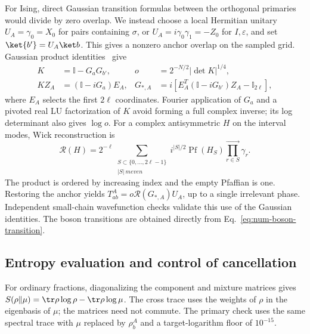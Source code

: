 For Ising, direct Gaussian transition formulas between the
orthogonal primaries would divide by zero overlap. We instead
choose a local Hermitian unitary $U_A=\gamma_0=X_0$ for pairs
containing $\sigma$, or $U_A=i\gamma_0\gamma_1=-Z_0$ for
$I,\varepsilon$, and set $\ket{b'}=U_A\ket b$.
This gives a nonzero anchor overlap on the sampled grid.
Gaussian product identities~\cite{numBravyi,numSurace} give
\begin{align}
 K&=\mathbb I-G_aG_{b'},&
 o&=2^{-N/2}|\det K|^{1/4},\nonumber\\
 KZ_A&=(\mathbb I-iG_a)E_A,&
 G_{*,A}&=i\left[E_A^T(\mathbb I-iG_{b'})Z_A-\mathbb I_{2\ell}\right],
 \label{eq:num-anchor-solve}
\end{align}
where $E_A$ selects the first $2\ell$ coordinates. Fourier
application of $G_a$ and a pivoted real LU factorization of
$K$ avoid forming a full complex inverse; its log determinant
also gives $\log o$. For a complex antisymmetric $H$ on the
interval modes, Wick reconstruction is
\begin{equation}
 \mathcal R(H)=2^{-\ell}
 \sum_{\substack{S\subset\{0,\ldots,2\ell-1\}\\|S|\ {
m even}}}
 i^{|S|/2}\operatorname{Pf}(H_S)
       \prod_{r\in S}^{\longrightarrow}\gamma_r.
 \label{eq:num-wick}
\end{equation}
The product is ordered by increasing index and the empty
Pfaffian is one. Restoring the anchor yields
$T_{ab}^A=o\mathcal R(G_{*,A})U_A$, up to a single irrelevant
phase. Independent small-chain wavefunction checks validate
this use of the Gaussian identities. The boson transitions
are obtained directly from Eq.~\eqref{eq:num-boson-transition}.

\subsection{Entropy evaluation and control of cancellation}
\label{app:num-precision}
For ordinary fractions, diagonalizing the component and mixture
matrices gives $S(\rho\|\mu)=\tr\rho\log\rho-\tr\rho\log\mu$.
The cross trace uses the weights of $\rho$ in the eigenbasis
of $\mu$; the matrices need not commute. The primary check
uses the same spectral trace with $\mu$ replaced by $\rho_b^A$
and a target-logarithm floor of $10^{-15}$.

